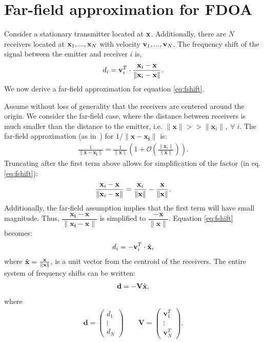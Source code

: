 \section{Far-field approximation for FDOA}
\label{s:FDOA}
Consider a stationary transmitter located at $\mathbf{x}$. Additionally, there are $N$ receivers located at $\mathbf{x}_1, ...,\mathbf{x}_N$ with velocity $\mathbf{v}_1, ...,\mathbf{v}_N$. The frequency shift of the signal between the emitter and receiver $i$ is,
\begin{align}
  \label{eq:fshift}
  d_i =  \mathbf{v}_i^T\cdot\frac{\mathbf{x}_i-\mathbf{x}}{\|\mathbf{x}_i-\mathbf{x}\|}.
\end{align}
We now derive a far-field approximation for equation \ref{eq:fshift}.

Assume without loss of generality that the receivers are centered around the origin. We consider the far-field case, where the distance between receivers is much smaller than the distance to the emitter, i.e. $\|\mathbf{x}\|>>\|\mathbf{x}_i\|, \; \forall \; i$. The far-field approximation (as in~\cite{Cheney2009}) for $1/\|\mathbf{x-x_i}\|$ is:
\begin{align*}
  \frac{1}{\|\mathbf{x-x_i}\|} = \frac{1}{\|\mathbf{x}\|}\left(1+\mathcal{O}\left(\frac{\|\mathbf{x}_i\|}{\|\mathbf{x}\|}\right)\right).
\end{align*}
Truncating after the first term above allows for simplification of the factor (in eq. \ref{eq:fshift}):
\begin{align*}
  \frac{\mathbf{x}_i-\mathbf{x}}{\|\mathbf{x}_i-\mathbf{x}\|} = \frac{\mathbf{x}_i}{\|\mathbf{x}\|}-\frac{\mathbf{x}}{\|\mathbf{x}\|}.
\end{align*}
Additionally, the far-field assumption implies that the first term will have small magnitude. Thus, $\dfrac{\mathbf{x_i-x}}{\|\mathbf{x_i-x}\|}$ is simplified to $\dfrac{-\mathbf{x}}{\|\mathbf{x}\|}$.
Equation \ref{eq:fshift} becomes:
\begin{align}
  d_i =  -\mathbf{v}_i^T\cdot\hat{\mathbf{x}},
\end{align}
where $\hat{\mathbf{x}} = \frac{\mathbf{x}}{\|\mathbf{x}\|}$, is a unit vector from the centroid of the receivers. The entire system of frequency shifts can be written:
\begin{align}
  \label{eq:fshiftFF}
\mathbf{d} = -\mathbf{V}\hat{\mathbf{x}},
\end{align}
where \begin{align*}
\mathbf{d}=\begin{pmatrix}
d_1 \\ \vdots \\ d_N
\end{pmatrix}
\qquad
\mathbf{V}=\begin{pmatrix}
\mathbf{v}_1^T \\ \vdots\\ \mathbf{v}_N^T
\end{pmatrix}.
\end{align*}

